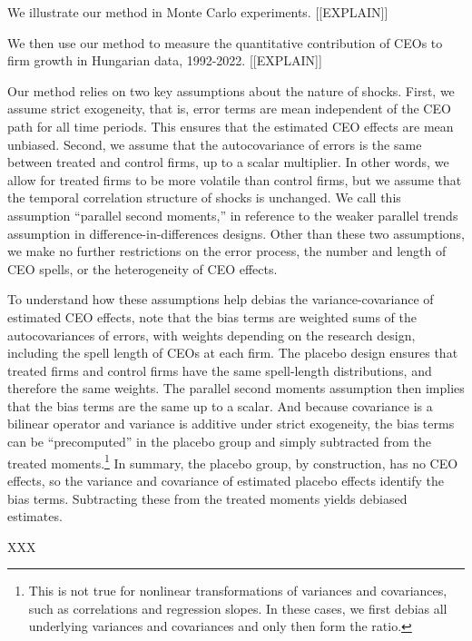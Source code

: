 \documentclass[11pt,a4paper]{article}
\begin{document}
We illustrate our method in Monte Carlo experiments. [[EXPLAIN]]

We then use our method to measure the quantitative contribution of CEOs to firm growth in Hungarian data, 1992-2022. [[EXPLAIN]]

Our method relies on two key assumptions about the nature of shocks. First, we assume strict exogeneity, that is, error terms are mean independent of the CEO path for all time periods. This ensures that the estimated CEO effects are mean unbiased. Second, we assume that the autocovariance of errors is the same between treated and control firms, up to a scalar multiplier. In other words, we allow for treated firms to be more volatile than control firms, but we assume that the temporal correlation structure of shocks is unchanged. We call this assumption ``parallel second moments,'' in reference to the weaker parallel trends assumption in difference-in-differences designs. Other than these two assumptions, we make no further restrictions on the error process, the number and length of CEO spells, or the heterogeneity of CEO effects.

To understand how these assumptions help debias the variance-covariance of estimated CEO effects, note that the bias terms are weighted sums of the autocovariances of errors, with weights depending on the research design, including the spell length of CEOs at each firm. The placebo design ensures that treated firms and control firms have the same spell-length distributions, and therefore the same weights. The parallel second moments assumption then implies that the bias terms are the same up to a scalar. And because covariance is a bilinear operator and variance is additive under strict exogeneity, the bias terms can be ``precomputed'' in the placebo group and simply subtracted from the treated moments.\footnote{This is not true for nonlinear transformations of variances and covariances, such as correlations and regression slopes. In these cases, we first debias all underlying variances and covariances and only then form the ratio.} In summary, the placebo group, by construction, has no CEO effects, so the variance and covariance of estimated placebo effects identify the bias terms. Subtracting these from the treated moments yields debiased estimates.

XXX
\end{document}
